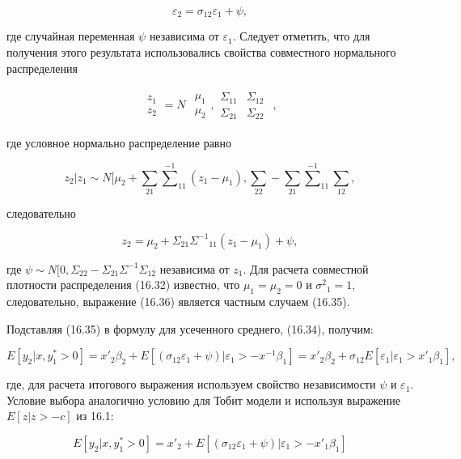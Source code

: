\begin{equation}
\varepsilon_2=\sigma_{12}\varepsilon_1+\psi,
\end{equation} 

где случайная переменная $\psi$ независима от $\varepsilon_1$. Следует отметить, что для получения этого результата использовались свойства совместного нормального распределения

\[
\begin{matrix}
z_1\\z_2
\end{matrix}
=
N
\begin{matrix}
\begin{matrix}
{\mu}_1\\{\mu}_2
\end{matrix},
\begin{matrix}
\Sigma_{11}&\Sigma_{12} \\ \Sigma_{21}&\Sigma_{22}
\end{matrix}
\end{matrix},
\]

где условное нормально распределение равно

\[
z_2|z_1{\sim}N[\mu_2+\sum_{21}{\sum^{-1}}_{11}(z_{1}-\mu_1),\sum_{22}-\sum_{21}{\sum^{-1}}_{11}\sum_{12},
\]

следовательно

\begin{equation}
z_2=\mu_2+\Sigma_{21}{\Sigma^{-1}}_{11}(z_1-\mu_1)+\psi,
\end{equation}

где $\psi{\sim}N[0,\Sigma_{22}-\Sigma_{21}{\Sigma^{-1}}\Sigma_{12}$ независима от $z_1$. Для расчета совместной плотности распределения (16.32) известно, что $\mu_1=\mu_2=0$ и ${\sigma^{2}}_1=1$, следовательно, выражение (16.36) является частным случаем (16.35).

Подставляя (16.35) в формулу для усеченного среднего, (16.34), получим:

\[
E[y_2|x,y^{*}_1>0]=x'_2\beta_2+E[(\sigma_{12}\varepsilon_1+\psi)|\varepsilon_1>-x^{-1}\beta_1]=x'_{2}\beta_2+\sigma_{12}E[\varepsilon_1|\varepsilon_1>x'_1\beta_1],
\]
 
где, для расчета итогового выражения используем свойство независимости $\psi$ и $\varepsilon_1$. Условие выбора аналогично условию для Тобит модели и используя выражение $E[z|z>{-c}]$ из 16.1:

\[
E[y_2|x,y^{*}_1>0]={x'}_2+E[(\sigma_{12}\varepsilon_{1}+\psi)|\varepsilon_1>-{x'}_1\beta_1]
\]

